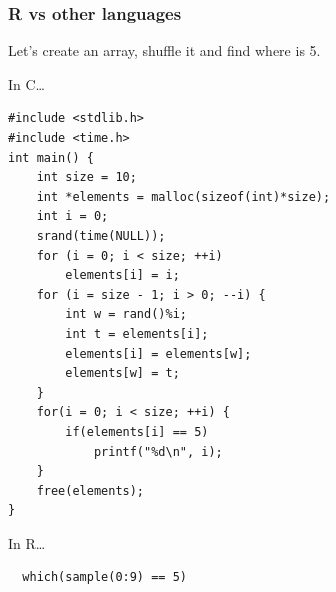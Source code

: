 \documentclass[10pt]{beamer}
\newenvironment{xframe}[2][]
  {\begin{frame}[fragile,environment=xframe,#1]
  \frametitle{#2}}
  {\end{frame}}
\begin{document}

\begin{xframe}{R vs other languages}
\begin{block}{Let's create an array, shuffle it and find where is 5.}
\end{block}
  \begin{exampleblock}{In C\ldots} 
  {\tiny  \begin{Verbatim}
#include <stdlib.h>
#include <time.h>   
int main() {
    int size = 10;
    int *elements = malloc(sizeof(int)*size);
    int i = 0;
    srand(time(NULL));
    for (i = 0; i < size; ++i)
        elements[i] = i;
    for (i = size - 1; i > 0; --i) {
        int w = rand()%i;
        int t = elements[i];
        elements[i] = elements[w];
        elements[w] = t;
    }
    for(i = 0; i < size; ++i) {
        if(elements[i] == 5)
            printf("%d\n", i);
    }
    free(elements);
} 
	\end{Verbatim}
}
  \end{exampleblock}
  \begin{exampleblock}{In R\ldots}
  {\tiny  \begin{Verbatim}
  which(sample(0:9) == 5)
  \end{Verbatim}
  }
  \end{exampleblock}

\end{xframe}

\end{document}

